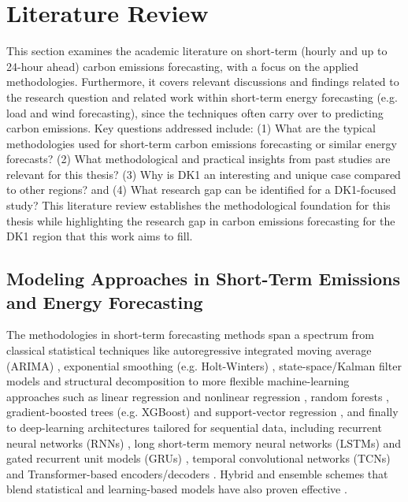 \thispagestyle{plain}
\section{Literature Review}
\label{sec:lit}

This section examines the academic literature on short-term (hourly and up to 24-hour ahead) carbon emissions forecasting, with a focus on the applied methodologies. Furthermore, it covers relevant discussions and findings related to the research question and related work within short-term energy forecasting (e.g. load and wind forecasting), since the techniques often carry over to predicting carbon emissions. Key questions addressed include: (1) What are the typical methodologies used for short-term carbon emissions forecasting or similar energy forecasts? (2) What methodological and practical insights from past studies are relevant for this thesis? (3) Why is DK1 an interesting and unique case compared to other regions? and (4) What research gap can be identified for a DK1-focused study? This literature review establishes the methodological foundation for this thesis while highlighting the research gap in carbon emissions forecasting for the DK1 region that this work aims to fill.

\subsection{Modeling Approaches in Short-Term Emissions and Energy Forecasting}

The methodologies in short-term forecasting methods span a spectrum from classical statistical techniques like autoregressive integrated moving average (ARIMA) \parencite{box2015}, exponential smoothing (e.g. Holt-Winters) \parencite{hyndman2021}, state-space/Kalman filter models \parencite{durbin2001} and structural decomposition \parencite{harvey1993} to more flexible machine-learning approaches such as linear regression \parencite{douglas2021} and nonlinear regression \parencite{seber2003}, random forests \parencite{breiman2001}, gradient-boosted trees (e.g. XGBoost) \parencite{chen2016} and support-vector regression \parencite{drucker1997}, and finally to deep-learning architectures tailored for sequential data, including recurrent neural networks (RNNs) \parencite{elman1990}, long short-term memory neural networks (LSTMs) \parencite{hochreiter1997} and gated recurrent unit models (GRUs) \parencite{cho2014}, temporal convolutional networks (TCNs) \parencite{bai2018} and Transformer-based encoders/decoders \parencite{vaswani2017}. Hybrid and ensemble schemes that blend statistical and learning-based models have also proven effective \parencite{zhang2003}.

